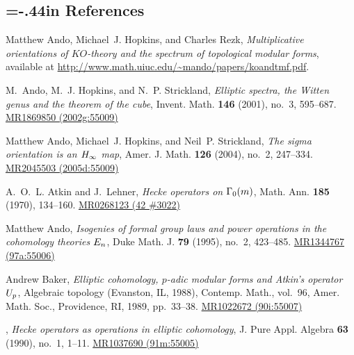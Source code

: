 \documentclass{gtpart}
\theoremstyle{definition}
\theoremstyle{remark}
\renewcommand{\=}{\approx}
\renewcommand{\-}{\sim}
\numberwithin{equation}{section}
\numberwithin{thm}{section}
\begin{document}
% 
% 

\renewcommand\refname{}
\newcommand{\MRn}[2]{\href{http://www.ams.org/mathscinet-getitem?mr=#1}{MR#1 #2}}
\newcommand{\AX}[1]{\href{http://arxiv.org/abs/#1}{arXiv:#1}}
\begin{thebibliography}

\section*{\leftskip=-.44in References \vspace{.13in}}

Matthew Ando, Michael~J. Hopkins, and Charles Rezk, \emph{Multiplicative
  orientations of {$KO$}-theory and the spectrum of topological modular forms}, 
  available at \href{http://www.math.uiuc.edu/~mando/papers/koandtmf.pdf}{http://www.math.uiuc.edu/\textasciitilde mando/papers/koandtmf.pdf}.

M.~Ando, M.~J. Hopkins, and N.~P. Strickland, \emph{Elliptic spectra, the
  {W}itten genus and the theorem of the cube}, Invent. Math. \textbf{146}
  (2001), no.~3, 595--687. \MRn{1869850}{(2002g:55009)}

Matthew Ando, Michael~J. Hopkins, and Neil~P. Strickland, \emph{The sigma
  orientation is an {$H\sb \infty$} map}, Amer. J. Math. \textbf{126} (2004),
  no.~2, 247--334. \MRn{2045503}{(2005d:55009)}

A.~O.~L. Atkin and J.~Lehner, \emph{Hecke operators on {$\Gamma \sb{0}(m)$}},
  Math. Ann. \textbf{185} (1970), 134--160. \MRn{0268123}{(42 \#3022)}

Matthew Ando, \emph{Isogenies of formal group laws and power operations in the
  cohomology theories {$E\sb n$}}, Duke Math. J. \textbf{79} (1995), no.~2,
  423--485. \MRn{1344767}{(97a:55006)}

Andrew Baker, \emph{Elliptic cohomology, {$p$}-adic modular forms and {A}tkin's
  operator {$U\sb p$}}, Algebraic topology ({E}vanston, {IL}, 1988), Contemp.
  Math., vol.~96, Amer. Math. Soc., Providence, RI, 1989, pp.~33--38.
  \MRn{1022672}{(90i:55007)}

\bysame, \emph{Hecke operators as operations in elliptic cohomology}, J. Pure
  Appl. Algebra \textbf{63} (1990), no.~1, 1--11. \MRn{1037690}{(91m:55005)}


\end{thebibliography}
\end{document}
